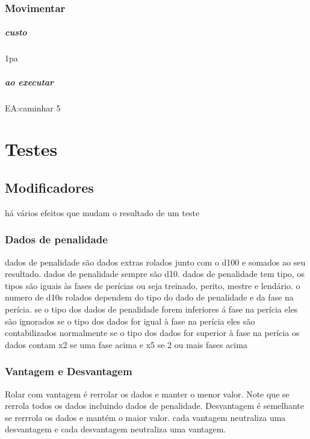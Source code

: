 \subsection{Movimentar}
\paragraph{custo} 1pa
\paragraph{ao executar} EA:caminhar 5

%
%
%
%
\chapter{Testes}

\section{Modificadores}
há vários efeitos que mudam o resultado de um teste
\subsection{Dados de penalidade}
dados de penalidade são dados extras rolados junto com o d100 e somados ao seu resultado. 
dados de penalidade sempre são d10.
dados de penalidade tem tipo, os tipos são iguais às fases de perícias 
ou seja treinado, perito, mestre e lendário.
o numero de d10s rolados dependem do tipo do dado de penalidade e da fase na perícia.
se o tipo dos dados de penalidade forem inferiores á fase na perícia eles são ignorados
se o tipo dos dados for igual à fase na perícia eles são contabilizados normalmente
se o tipo dos dados for superior à fase na perícia os dados contam x2 se uma fase acima
e x5 se 2 ou mais fases acima
\subsection{Vantagem e Desvantagem}
Rolar com vantagem é rerrolar os dados e manter o menor valor.
Note que se rerrola todos os dados incluindo dados de penalidade.
Desvantagem é semelhante  se rerrrola os dados e mantém o maior valor.
cada vantagem neutraliza uma desvantagem e cada desvantagem neutraliza uma vantagem.
